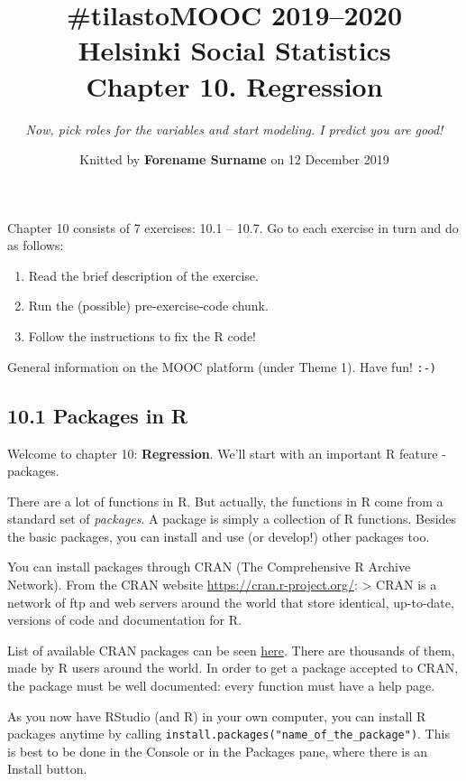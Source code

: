\documentclass[]{article}
\title{\#tilastoMOOC 2019--2020\\
\textbf{Helsinki Social Statistics}\\
Chapter 10. Regression}
\subtitle{\emph{Now, pick roles for the variables and start modeling. I predict
you are good!}}
\author{Knitted by \textbf{Forename Surname} on 12 December 2019}
\date{}
\providecommand{\tightlist}{%
  \setlength{\itemsep}{0pt}\setlength{\parskip}{0pt}}
\begin{document}
\maketitle

{
\setcounter{tocdepth}{2}
\tableofcontents
}
Chapter 10 consists of 7 exercises: 10.1 -- 10.7. Go to each exercise in
turn and do as follows:

\begin{enumerate}
\def\labelenumi{\arabic{enumi}.}
\tightlist
\item
  Read the brief description of the exercise.
\item
  Run the (possible) pre-exercise-code chunk.
\item
  Follow the instructions to fix the R code!
\end{enumerate}

General information on the MOOC platform (under Theme 1). Have fun!
\texttt{:-)}

\hypertarget{packages-in-r}{%
\subsection{10.1 Packages in R}\label{packages-in-r}}

Welcome to chapter 10: \textbf{Regression}. We'll start with an
important R feature - packages.

There are a lot of functions in R. But actually, the functions in R come
from a standard set of \emph{packages}. A package is simply a collection
of R functions. Besides the basic packages, you can install and use (or
develop!) other packages too.

You can install packages through CRAN (The Comprehensive R Archive
Network). From the CRAN website \url{https://cran.r-project.org/}:
\textgreater{} CRAN is a network of ftp and web servers around the world
that store identical, up-to-date, versions of code and documentation for
R.

List of available CRAN packages can be seen
\href{https://cran.r-project.org/web/packages/available_packages_by_name.html}{here}.
There are thousands of them, made by R users around the world. In order
to get a package accepted to CRAN, the package must be well documented:
every function must have a help page.

As you now have RStudio (and R) in your own computer, you can install R
packages anytime by calling
\texttt{install.packages("name\_of\_the\_package")}. This is best to be
done in the Console or in the Packages pane, where there is an Install
button.
\end{document}
